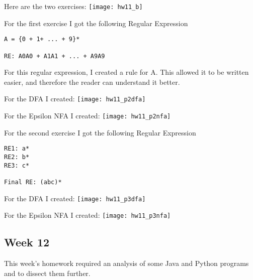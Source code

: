 \documentclass{article}
\theoremstyle{theorem}
\theoremstyle{definition}
\theoremstyle{remark}
\begin{document}
\noindent\newline Here are the two exercises:\newline
\texttt{[image: hw11\_b]}

\noindent\newline\newline For the first exercise I got the following Regular Expression
\begin{verbatim}
A = {0 + 1+ ... + 9}*

RE: A0A0 + A1A1 + ... + A9A9
\end{verbatim}

\noindent\newline For this regular expression, I created a rule for A. This allowed it to be written easier, and therefore the reader can understand it better.

\noindent\newline\newline For the DFA I created:\newline
\texttt{[image: hw11\_p2dfa]}

\noindent\newline\newline For the Epsilon NFA I created:\newline
\texttt{[image: hw11\_p2nfa]}

\noindent\newline\newline For the second exercise I got the following Regular Expression
\begin{verbatim}
RE1: a*
RE2: b*
RE3: c*

Final RE: (abc)*
\end{verbatim}

\noindent\newline\newline For the DFA I created:\newline
\texttt{[image: hw11\_p3dfa]}

\noindent\newline\newline For the Epsilon NFA I created:\newline
\texttt{[image: hw11\_p3nfa]}


\subsection{Week 12}
\noindent\newline This week's homework required an analysis of some Java and Python programs and to dissect them further.
\end{document}
